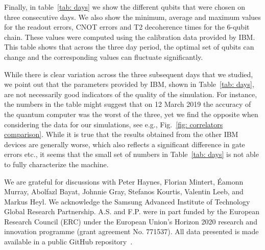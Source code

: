 \documentclass[twocolumn,showpacs,preprintnumbers,nofootinbib,amsmath,aps,pra,longbibliography,amssymb,superscriptaddress]{revtex4-1}
\begin{document}
Finally, in table~\ref{tab: days} we show the different qubits that were chosen on three consecutive days. We also show the minimum, average and maximum values for the readout errors, CNOT errors and T2 decoherence times for the 6-qubit chain. These values were computed using the calibration data provided by IBM. This table shows that across the three day period, the optimal set of qubits can change and the corresponding values can fluctuate significantly.




While there is clear variation across the three subsequent days that we studied, we point out that the parameters provided by IBM, shown in Table~\ref{tab: days}, are not necessarily good indicators of the quality of the simulation. For instance, the numbers in the table might suggest that on 12 March 2019 the accuracy of the quantum computer was the worst of the three, yet we find the opposite when considering the data for our simulations, see e.g., Fig.~\ref{fig: correlators comparison}. While it is true that the results obtained from the other IBM devices are generally worse, which also reflects a significant difference in gate errors etc., it seems that the small set of numbers in Table~\ref{tab: days} is not able to fully characterize the machine.


















\hfill
\begin{acknowledgements}
	We are grateful for discussions with Peter Haynes, Florian Mintert, {\'E}amonn Murray, Abolfazl Bayat, Johnnie Gray, Stefanos Kourtis, Valentin Leeb, and Markus Heyl.
	We acknowledge the Samsung Advanced Institute of Technology Global Research Partnership. A.S. and F.P. were in part funded by the European Research Council (ERC) under the European Union's Horizon 2020 research and innovation programme (grant agreement No. 771537). All data presented is made available in a public GitHub repository~\cite{IBMdata}.
\end{acknowledgements}
\end{document}
